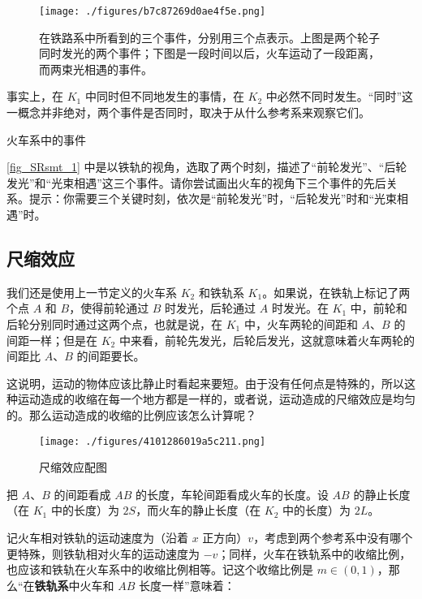 \begin{figure}[ht]
\centering
\texttt{[image: ./figures/b7c87269d0ae4f5e.png]}
\caption{在铁路系中所看到的三个事件，分别用三个点表示。上图是两个轮子同时发光的两个事件；下图是一段时间以后，火车运动了一段距离，而两束光相遇的事件。} \label{fig_SRsmt_1}
\end{figure}

事实上，在 $K_1$ 中同时但不同地发生的事情，在 $K_2$ 中必然不同时发生。“同时”这一概念并非绝对，两个事件是否同时，取决于从什么参考系来观察它们。

\begin{exercise}{火车系中的事件}

\autoref{fig_SRsmt_1} 中是以铁轨的视角，选取了两个时刻，描述了“前轮发光”、“后轮发光”和“光束相遇”这三个事件。请你尝试画出火车的视角下三个事件的先后关系。提示：你需要三个关键时刻，依次是“前轮发光”时，“后轮发光”时和“光束相遇”时。

\end{exercise}

\subsection{尺缩效应}

我们还是使用上一节定义的火车系 $K_2$ 和铁轨系 $K_1$。如果说，在铁轨上标记了两个点 $A$ 和 $B$，使得前轮通过 $B$ 时发光，后轮通过 $A$ 时发光。在 $K_1$ 中，前轮和后轮分别同时通过这两个点，也就是说，在 $K_1$ 中，火车两轮的间距和 $A$、$B$ 的间距一样；但是在 $K_2$ 中来看，前轮先发光，后轮后发光，这就意味着火车两轮的间距比 $A$、$B$ 的间距要长。

这说明，运动的物体应该比静止时看起来要短。由于没有任何点是特殊的，所以这种运动造成的收缩在每一个地方都是一样的，或者说，运动造成的尺缩效应是均匀的。那么运动造成的收缩的比例应该怎么计算呢？

\begin{figure}[ht]
\centering
\texttt{[image: ./figures/4101286019a5c211.png]}
\caption{尺缩效应配图} \label{fig_SRsmt_2}
\end{figure}

把 $A$、$B$ 的间距看成 $AB$ 的长度，车轮间距看成火车的长度。设 $AB$ 的静止长度（在 $K_1$ 中的长度）为 $2S$，而火车的静止长度（在 $K_2$ 中的长度）为 $2L$。

记火车相对铁轨的运动速度为（沿着 $x$ 正方向）$v$，考虑到两个参考系中没有哪个更特殊，则铁轨相对火车的运动速度为 $-v$；同样，火车在铁轨系中的收缩比例，也应该和铁轨在火车系中的收缩比例相等。记这个收缩比例是 $m\in(0,1)$，那么“在\textbf{铁轨系}中火车和 $AB$ 长度一样”意味着：

